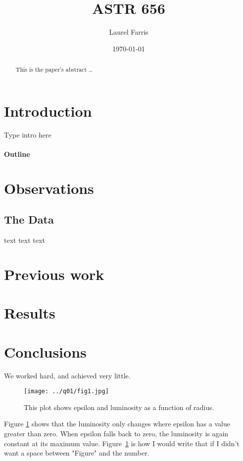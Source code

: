 \documentclass[12pt]{article}
\title{ASTR 656}
\author{Laurel Farris}
\date{\today}
\begin{document}

\maketitle

\begin{abstract}
This is the paper's abstract \ldots  %
\end{abstract}

\section{Introduction}
Type intro here
\paragraph{Outline}  %
\section{Observations}
  \subsection{The Data}
  text text text
\section{Previous work}\label{previous work}
\section{Results}\label{results}
\section{Conclusions}\label{conclusions}
We worked hard, and achieved very little.





\begin{figure}[h]   %
\centering
\texttt{[image: ../q01/fig1.jpg]}
\caption{This plot shows epsilon and luminosity as a function of radius.}
\label{fig1}
\end{figure}

Figure \ref{fig1}  shows that the luminosity only changes where epsilon has a value
greater than zero. When epsilon falls back to zero, the luminosity is again
constant at its maximum value. Figure~\ref{fig1} is how I would write
that if I didn't want a space between "Figure" and the number.
\end{document}
